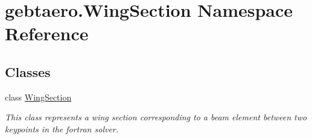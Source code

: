 \hypertarget{namespacegebtaero_1_1_wing_section}{}\section{gebtaero.\+Wing\+Section Namespace Reference}
\label{namespacegebtaero_1_1_wing_section}
\subsection*{Classes}
\begin{DoxyCompactItemize}
\item 
class \hyperlink{classgebtaero_1_1_wing_section_1_1_wing_section}{Wing\+Section}
\begin{DoxyCompactList}\small\item\em This class represents a wing section corresponding to a beam element between two keypoints in the fortran solver. \end{DoxyCompactList}\end{DoxyCompactItemize}
